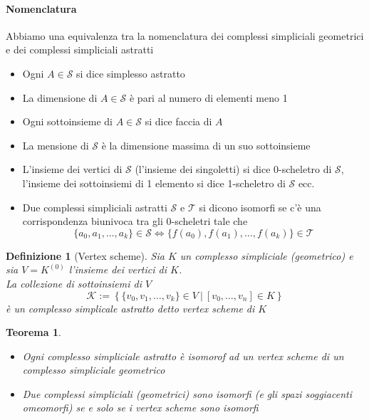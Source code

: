 \documentclass[a4paper]{report}
\newtheorem{theorem}{Teorema}
\newtheorem{definition}{Definizione}
\newcommand{\setst}[2]{\ensuremath{\left\{{#1}\ |\ {#2}\right\}}}
\newcommand{\pskel}[2]{\ensuremath{{#1}^{({#2})}}}
\begin{document}
\paragraph{Nomenclatura} Abbiamo una equivalenza tra la nomenclatura dei complessi simpliciali geometrici e dei complessi simpliciali astratti
\begin{itemize}
    \item Ogni $A\in\mathcal{S}$ si dice simplesso astratto
    \item La dimensione di $A\in\mathcal{S}$ è pari al numero di elementi meno 1
    \item Ogni sottoinsieme di $A\in\mathcal{S}$ si dice faccia di $A$
    \item La mensione di $\mathcal{S}$ è la dimensione massima di un suo sottoinsieme
    \item L'insieme dei vertici di $\mathcal{S}$ (l'insieme dei singoletti) si dice 0-scheletro di $\mathcal{S}$, l'insieme dei sottoinsiemi di 1 elemento si dice 1-scheletro di $\mathcal{S}$ ecc.
    \item Due complessi simpliciali astratti $\mathcal{S}$ e $\mathcal{T}$ si dicono isomorfi se c'è una corrispondenza biunivoca tra gli 0-scheletri tale che
          \[
              \{a_0,a_1,\dots,a_k\}\in\mathcal{S}\Longleftrightarrow \{f(a_0),f(a_1),\dots,f(a_k)\}\in\mathcal{T}
          \]
\end{itemize}
\pagebreak
\begin{definition}[Vertex scheme]
    Sia $K$ un complesso simpliciale (geometrico) e sia $V=\pskel{K}{0}$ l'insieme dei vertici di $K$.\\
    La collezione di sottoinsiemi di $V$
    \[
        \mathcal{K}:=\setst{\{v_0,v_1,\dots,v_k\}\in V}{[v_0,\dots,v_n]\in K}
    \]
    è un complesso simplicale astratto detto vertex scheme di $K$
\end{definition}
\begin{theorem}
    \begin{itemize}
        \item Ogni complesso simpliciale astratto è isomorof ad un vertex scheme di un complesso simpliciale geometrico
        \item Due complessi simpliciali (geometrici) sono isomorfi (e gli spazi soggiacenti omeomorfi) se e solo se i vertex scheme sono isomorfi
    \end{itemize}
\end{theorem}
\pagebreak
\end{document}

